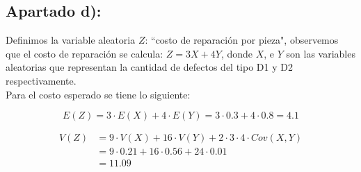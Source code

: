 \documentclass[11pt]{article}
\begin{document}
\subsection*{Apartado d):}
Definimos la variable aleatoria $Z$: ``costo de reparación por pieza", 
observemos que el costo de reparación se calcula: $Z = 3X + 4Y$, donde
$X$, e $Y$ son las variables aleatorias que representan la cantidad de 
defectos del tipo D1 y D2 respectivamente. \\

Para el costo esperado se tiene lo siguiente:

\begin{equation*}
    E(Z) = 3 \cdot E(X) + 4 \cdot E(Y) = 3 \cdot 0.3 + 4 \cdot 0.8 = 4.1
\end{equation*}

\begin{align*}
    V(Z) & = 9 \cdot V(X) + 16 \cdot V(Y) + 2 \cdot 3 \cdot 4 \cdot Cov(X, Y) \\
         & = 9 \cdot 0.21 + 16 \cdot 0.56 + 24 \cdot 0.01 \\
         & = 11.09 
\end{align*}
\end{document}

